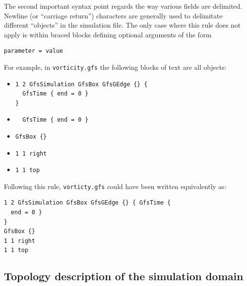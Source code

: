 \documentclass[a4paper]{article}
\begin{document}
The second important syntax point regards the way various fields are
delimited. Newline (or ``carriage return'') characters are generally used to
delimitate different ``objects'' in the simulation file. The only
case where this rule does not apply is within braced blocks defining
optional arguments of the form
\begin{verbatim}
parameter = value
\end{verbatim}
For example, in {\tt vorticity.gfs} the following blocks of text are
all objects:
\begin{itemize}
\item
\begin{verbatim}
1 2 GfsSimulation GfsBox GfsGEdge {} {
  GfsTime { end = 0 }
}
\end{verbatim}
\item
\begin{verbatim}
  GfsTime { end = 0 }
\end{verbatim}
\item
\begin{verbatim}
GfsBox {}
\end{verbatim}
\item
\begin{verbatim}
1 1 right
\end{verbatim}
\item
\begin{verbatim}
1 1 top
\end{verbatim}
\end{itemize}
Following this rule, {\tt vorticty.gfs} could have been written
equivalently as:
\begin{verbatim}
1 2 GfsSimulation GfsBox GfsGEdge {} { GfsTime {
  end = 0 }
}
GfsBox {}
1 1 right
1 1 top
\end{verbatim}

\subsection{Topology description of the simulation domain}
\end{document}

